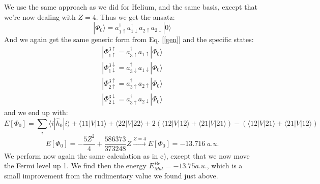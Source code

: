 \documentclass{article}
\begin{document}
\section{}
We use the same approach as we did for Helium, and the same basis, except that we're now dealing with $Z=4$. Thus we get the ansatz:
\begin{equation}
    |\Phi_0\rangle = a_{1\uparrow}^\dagger a_{1\downarrow}^\dagger a_{2\uparrow}a_{2\downarrow}|0\rangle
\end{equation}
And we again get the same generic form from Eq. [\ref{gen}] and the specific states:
\begin{gather*}
    |\Phi_{1\uparrow}^{3\uparrow} = a_{3\uparrow}^\dagger a_{1\uparrow} |\Phi_0 \rangle \\
    |\Phi_{1\downarrow}^{3\downarrow} = a_{3\downarrow}^\dagger a_{1\downarrow} |\Phi_0 \rangle \\
    |\Phi_{2\uparrow}^{3\uparrow} = a_{3\uparrow}^\dagger a_{2\uparrow} |\Phi_0 \rangle \\
    |\Phi_{2\downarrow}^{3\downarrow} = a_{3\uparrow}^\dagger a_{2\downarrow} |\Phi_0 \rangle
\end{gather*}
and we end up with:
\begin{equation*}
    E[\Phi_0] = \sum_i \langle i | \hat h_0 | i \rangle + \langle 11 | V | 11 \rangle + \langle 22 | V | 22 \rangle + 2\left(\langle 12 | V | 12 \rangle + \langle 21 | V | 21 \rangle\right) - \left(\langle 12|V|21\rangle + \langle 21|V| 12 \rangle \right)
\end{equation*}
\begin{equation}
    E[\Phi_0] = - \frac{5Z^2}{4} + \frac{586373}{373248}Z \xrightarrow[]{Z = 4} E\left[\Phi_0 \right] = -13.716 \; a.u.
\end{equation}
We perform now again the same calculation as in c), except that we now move the Fermi level up 1. We find then the energy $E_{Mat}^{Be} = -13.75 a.u.$, which is a small improvement from the rudimentary value we found just above.
\end{document}
